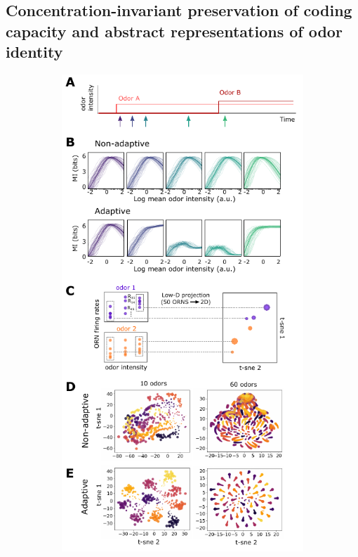 \documentclass[9pt,twocolumn,twoside,lineno]{pnas-new}
\begin{document}

\subsection{Concentration-invariant preservation of coding capacity and abstract representations of odor identity}



\begin{figure}[!tb]
	\centering
	\begin{subfigure}[t]{\linewidth}
		\includegraphics[width=\textwidth]{figures/2_coding_representation}

\end{subfigure}
\end{figure}
\end{document}
